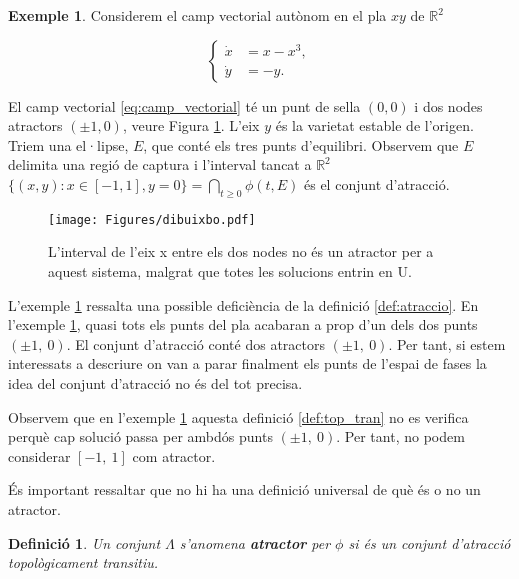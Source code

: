 \documentclass[11pt,a4paper,openright,oneside]{article}
\numberwithin{equation}{section}
\newtheorem{defi}[teo]{Definici\'o}
\theoremstyle{definition}
\newtheorem{ex}[teo]{Exemple}
\begin{document}
\begin{ex} \label{ex:atraccio}
    Considerem el camp vectorial autònom en el pla $xy$ de $\mathbb{R}^2$
    
    \begin{equation} \label{eq:camp_vectorial}
        \left\{ \begin{aligned} 
            \dot{x} &= x-x^{3}, \\
            \dot{y} &= -y.
        \end{aligned} \right.
    \end{equation}

    El camp vectorial \eqref{eq:camp_vectorial} té un punt de sella $(0,0)$ i dos nodes atractors $(\pm1, 0)$, veure Figura \ref{fig:topologicament_transitiu}. L'eix $y$ és la varietat estable de l'origen. Triem una el·lipse, $E$, que conté els tres punts d'equilibri. Observem que $E$ delimita una regió de captura i l'interval tancat a $\mathbb{R}^2$ $\{(x,y): x\in [-1, 1], y=0 \}=\bigcap_{t\geq 0}\phi(t,E)$ és el conjunt d'atracció.
        
    \begin{figure}[htpb]
        \centering
        \texttt{[image: Figures/dibuixbo.pdf]}
        \caption{L'interval de l'eix x entre els dos nodes no és un atractor per a aquest sistema, malgrat que totes les solucions entrin en U.}
        \label{fig:topologicament_transitiu}
    \end{figure}
\end{ex}

L'exemple \ref{ex:atraccio} ressalta una possible deficiència de la definició \ref{def:atraccio}. En l'exemple \ref{ex:atraccio}, quasi tots els punts del pla acabaran a prop d'un dels dos punts $(\pm 1,\ 0)$. El conjunt d'atracció conté dos atractors $(\pm 1, \ 0)$. Per tant, si estem interessats a descriure on van a parar finalment els punts de l'espai de fases la idea del conjunt d'atracció no és del tot precisa.

Observem que en l'exemple \ref{ex:atraccio} aquesta definició \ref{def:top_tran} no es verifica perquè cap solució passa per ambdós punts $(\pm 1,\ 0)$. Per tant, no podem considerar $[-1, \ 1]$ com atractor. 

És important ressaltar que no hi ha una definició universal de què és o no un atractor.

\begin{defi} \label{def: atractor}
    Un conjunt $\Lambda$ s'anomena \textbf{atractor} per $\phi$ si és un conjunt d'atracció topològicament transitiu.
\end{defi}
\end{document}
